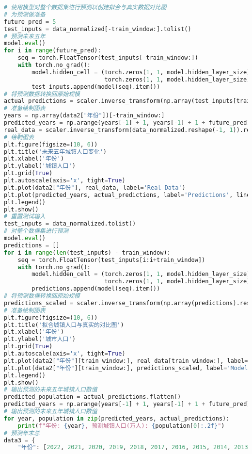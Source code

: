 \begin{lstlisting}[language=python,caption={城乡人口}]
# 使用模型对整个数据集进行预测以创建拟合与真实数据对比图
# 为预测做准备
future_pred = 5
test_inputs = data_normalized[-train_window:].tolist()
# 预测未来五年
model.eval()
for i in range(future_pred):
    seq = torch.FloatTensor(test_inputs[-train_window:])
    with torch.no_grad():
        model.hidden_cell = (torch.zeros(1, 1, model.hidden_layer_size),
                             torch.zeros(1, 1, model.hidden_layer_size))
        test_inputs.append(model(seq).item())
# 将预测数据转换回原始规模
actual_predictions = scaler.inverse_transform(np.array(test_inputs[train_window:] ).reshape(-1, 1))
# 准备绘制图表
years = np.array(data2["年份"])[-train_window:]
predicted_years = np.arange(years[-1] + 1, years[-1] + 1 + future_pred)
real_data = scaler.inverse_transform(data_normalized.reshape(-1, 1)).reshape(-1)
# 绘制图表
plt.figure(figsize=(10, 6))
plt.title('未来五年城镇人口变化')
plt.xlabel('年份')
plt.ylabel('城镇人口')
plt.grid(True)
plt.autoscale(axis='x', tight=True)
plt.plot(data2["年份"], real_data, label='Real Data')
plt.plot(predicted_years, actual_predictions, label='Predictions', linestyle='--')
plt.legend()
plt.show()
# 重置测试输入
test_inputs = data_normalized.tolist()
# 对整个数据集进行预测
model.eval()
predictions = []
for i in range(len(test_inputs) - train_window):
    seq = torch.FloatTensor(test_inputs[i:i+train_window])
    with torch.no_grad():
        model.hidden_cell = (torch.zeros(1, 1, model.hidden_layer_size),
                             torch.zeros(1, 1, model.hidden_layer_size))
        predictions.append(model(seq).item())
# 将预测数据转换回原始规模
predictions_scaled = scaler.inverse_transform(np.array(predictions).reshape(-1, 1))
# 准备绘制图表
plt.figure(figsize=(10, 6))
plt.title('拟合城镇人口与真实的对比图')
plt.xlabel('年份')
plt.ylabel('城市人口')
plt.grid(True)
plt.autoscale(axis='x', tight=True)
plt.plot(data2["年份"][train_window:], real_data[train_window:], label='Real Data')
plt.plot(data2["年份"][train_window:], predictions_scaled, label='Model Fit', linestyle='--')
plt.legend()
plt.show()
# 输出预测的未来五年城镇人口数值
predicted_population = actual_predictions.flatten()
predicted_years = np.arange(years[-1] + 1, years[-1] + 1 + future_pred)
# 输出预测的未来五年城镇人口数值
for year, population in zip(predicted_years, actual_predictions):
    print(f"年份: {year}, 预测城镇人口(万人): {population[0]:.2f}")
# 预测年末总
data3 = {
    "年份": [2022, 2021, 2020, 2019, 2018, 2017, 2016, 2015, 2014, 2013, 2012, 2011, 2010, 2009, 2008, 2007, 2006, 2005, 2004, 2003, 2002, 2001, 2000, 1999, 1998, 1997, 1996, 1995, 1994, 1993, 1992, 1991, 1990],

\end{lstlisting}

